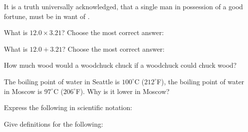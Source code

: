 \documentclass[11pt,addpoints]{exam}   	%
\begin{document}
\begin{questions}
\vspace{.2in}


\question[1]
It is a truth universally acknowledged, that a single man in possession of a good fortune, must be in want of \fillin[a wife].
\vspace{.2in}

\pagebreak

\question[1] What is $ 12.0 \times 3.21 $? Choose the most correct answer:
\begin{choices}
\end{choices}
\vspace{.2in}

\question[1] What is $ 12.0 + 3.21 $? Choose the most correct answer:
\begin{choices}
\end{choices}
\vspace{.2in}

\question[1] How much wood would a woodchuck chuck if a woodchuck could chuck wood?
\vspace{.2in}

\question[1] The boiling point of water in Seattle is $100^{\circ}$C ($212^{\circ}$F), the boiling point of water in Moscow is $97^{\circ}$C ($206^{\circ}$F). Why is it lower in Moscow?
\vspace{.2in}

\question Express the following in scientific notation:
\vspace{.2in}

\question Give definitions for the following:
\end{questions}
\end{document}
